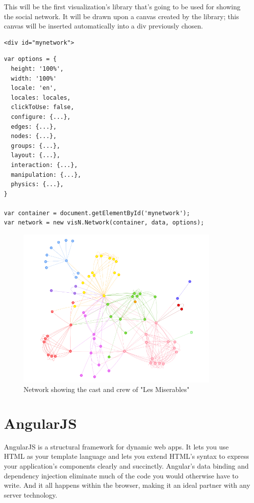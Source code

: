 \documentclass[a4paper, 12pt]{book}
\begin{document}
This will be the first visualization’s library that’s going to be used for showing the social network. It will be drawn upon a canvas created by the library; this canvas will be inserted automatically into a div previously chosen.

\begin{lstlisting}[frame=single]
<div id="mynetwork">
\end{lstlisting}

\begin{lstlisting}[frame=single]
var options = {
  height: '100%',
  width: '100%'
  locale: 'en',
  locales: locales,
  clickToUse: false,
  configure: {...},    
  edges: {...},        
  nodes: {...},
  groups: {...},       
  layout: {...},       
  interaction: {...},  
  manipulation: {...}, 
  physics: {...},      
}

var container = document.getElementById('mynetwork');
var network = new visN.Network(container, data, options);
\end{lstlisting}

\begin{figure}[H]
  \centering
  \includegraphics[width=10cm, keepaspectratio]{img/context/visjs}
  \caption {Network showing the cast and crew of "Les Miserables"}
  \label{fig:visjsex}
\end{figure}

\section{AngularJS}
\label{sec:angular}
AngularJS is a structural framework for dynamic web apps. It lets you use HTML as your template language and lets you extend HTML's syntax to express your application's components clearly and succinctly. Angular's data binding and dependency injection eliminate much of the code you would otherwise have to write. And it all happens within the browser, making it an ideal partner with any server technology.
\end{document}
